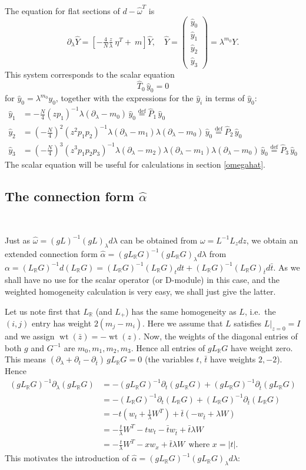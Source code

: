 \documentclass[a4paper,12pt,leqno]{amsart}
\numberwithin{equation}{section}
\theoremstyle{plain}
\theoremstyle{definition}
\newcommand{\R}{\mathbb R}
\newcommand{\al}{\alpha}
\newcommand{\la}{\lambda}
\newcommand{\om}{\omega}
\DeclareMathOperator{\wt}{wt}
\renewcommand{\b}{\partial}
\newcommand{\bla}{\b_\la}
\newcommand{\bt}{\b_t}
\newcommand{\btbar}{\b_{\bar t}}
\newcommand{\bp}{\begin{pmatrix}}
\newcommand{\ep}{\end{pmatrix}}
\newcommand{\zbar}{  {\bar z}  }
\newcommand{\tbar}{  {\bar t}  }
\newcommand{\nn}{m}
\begin{document}
The equation for flat sections of $d-\hat\om^T$ is
\begin{equation}\label{hatomsec}
\bla \hat Y =\left[
-\tfrac4N \tfrac{z}{\la}
\ \eta^T
+
\ \nn
\right] \hat Y,\quad
\hat Y= 
\bp
\hat y_0 \\ \hat y_1 \\ \hat y_2 \\ \hat y_3
\ep
=
\la^{\nn_0} Y.
\end{equation}
This system corresponds to the scalar equation
\[
\hat T_0 \,\hat y_0=0
\]
for $\hat y_0=\la^{\nn_0} y_0$, together with the expressions for the $\hat y_i$ in terms of $\hat y_0$:
\begin{align*}
\hat y_1& =-\tfrac N4 (zp_1)^{-1} \la  (\bla-\nn_0) \,\hat y_0
\overset{\scriptstyle \text{def} }=\hat P_1\,\hat y_0
\\ 
\hat y_2&=\left(-\tfrac N4\right)^2 (z^2p_1p_2)^{-1} \la  (\bla-\nn_1) \la (\bla-\nn_0) \,\hat y_0
\overset{\scriptstyle \text{def} }=\hat P_2\,\hat y_0
\\
\hat y_3&=\left(-\tfrac N4\right)^3 (z^3p_1p_2p_3)^{-1} \la  (\bla-\nn_2) \la  (\bla-\nn_1) \la (\bla-\nn_0) \,\hat y_0
\overset{\scriptstyle \text{def} }=\hat P_3\,\hat y_0
\end{align*}
The scalar equation will be useful for calculations in section \ref{omegahat}.

\subsection{The connection form $\hat\al$}\label{four4}   \ 

Just as $\hat\om=(gL)^{-1}(gL)_\la d\la$ can be obtained from $\om= 
L^{-1}L_z dz$, we obtain an extended connection form 
$\hat\al=(gL_\R G)^{-1}(gL_\R G)_\la d\la$ from $\al=(L_\R G)^{-1}d(L_\R G)
= (L_\R G)^{-1}(L_\R G)_t dt + (L_\R G)^{-1}(L_\R G)_\tbar d\tbar$.
As we shall have no use for the scalar operator (or D-module) in this case, and the weighted homogeneity calculation is 
very easy,  we shall just give the latter.

Let us note first that $L_\R$ (and $L_+$) has the same homogeneity as $L$, i.e.\ the 
$(i,j)$ entry has weight $2(\nn_j-\nn_i)$.  Here we assume that $L$ satisfies $L\vert_{z=0}=I$
and we assign $\wt(\zbar)=-\wt(z)$.  
Now, the weights of the diagonal entries of both $g$ and $G^{-1}$ are $\nn_0,\nn_1,\nn_2,\nn_3$.  Hence all entries of $g L_\R G$ have weight zero. This means
$(\bla+\bt-\btbar)\, g L_\R G=0$ (the variables $t$, $\tbar$ have weights $2,-2$).  Hence
\begin{align*}
(gL_\R G)^{-1}\bla (gL_\R G)  &= 
-(gL_\R G)^{-1}\bt (gL_\R G) + (gL_\R G)^{-1}\btbar(gL_\R G)
\\
&= 
-(L_\R G)^{-1}\bt (L_\R G) + (L_\R G)^{-1}\btbar(L_\R G)
\\
&=-t(w_t+\tfrac1\la W^T) + \tbar(-w_{\tbar} + \la W)
\\
&= -\tfrac t\la W^T - tw_t - \tbar w_{\tbar} + \tbar\la W
\\
&=-\tfrac t\la W^T - xw_x + \tbar\la W \ \ \text{where $x=\vert t\vert$}.
\end{align*} 
This motivates the introduction of  
$\hat\al=(gL_\R G)^{-1}(gL_\R G)_\la d\la$:
\end{document}
